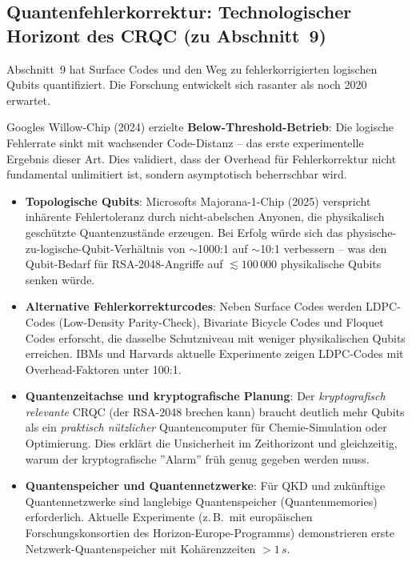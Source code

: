 ﻿\documentclass[a4paper,12pt]{article}
\theoremstyle{definition}
\begin{document}
\subsection{Quantenfehlerkorrektur: Technologischer Horizont des CRQC (zu Abschnitt~9)}

Abschnitt~9 hat Surface Codes und den Weg zu fehlerkorrigierten
logischen Qubits quantifiziert. Die Forschung entwickelt sich
rasanter als noch 2020 erwartet.

Googles Willow-Chip (2024) erzielte \textbf{Below-Threshold-Betrieb}:
Die logische Fehlerrate sinkt mit wachsender Code-Distanz -- das erste
experimentelle Ergebnis dieser Art. Dies validiert, dass der
Overhead für Fehlerkorrektur nicht fundamental unlimitiert ist,
sondern asymptotisch beherrschbar wird.

\begin{itemize}
  \item \textbf{Topologische Qubits}:
    Microsofts Majorana-1-Chip (2025) verspricht inhärente
    Fehlertoleranz durch nicht-abelschen Anyonen, die physikalisch
    geschützte Quantenzustände erzeugen. Bei Erfolg würde sich das
    physische-zu-logische-Qubit-Verhältnis von $\sim$1000:1 auf
    $\sim$10:1 verbessern -- was den Qubit-Bedarf für RSA-2048-Angriffe
    auf $\lesssim 100\,000$ physikalische Qubits senken würde.
  \item \textbf{Alternative Fehlerkorrekturcodes}:
    Neben Surface Codes werden LDPC-Codes (Low-Density Parity-Check),
    Bivariate Bicycle Codes und Floquet Codes erforscht,
    die dasselbe Schutzniveau mit weniger physikalischen Qubits erreichen.
    IBMs und Harvards aktuelle Experimente zeigen LDPC-Codes mit
    Overhead-Faktoren unter 100:1.
  \item \textbf{Quantenzeitachse und kryptografische Planung}:
    Der \emph{kryptografisch relevante} CRQC (der RSA-2048 brechen kann)
    braucht deutlich mehr Qubits als ein \emph{praktisch nützlicher}
    Quantencomputer für Chemie-Simulation oder Optimierung.
    Dies erklärt die Unsicherheit im Zeithorizont und gleichzeitig,
    warum der kryptografische ''Alarm'' früh genug gegeben werden muss.
  \item \textbf{Quantenspeicher und Quantennetzwerke}:
    Für QKD und zukünftige Quantennetzwerke sind langlebige
    Quantenspeicher (Quantenmemories) erforderlich. Aktuelle
    Experimente (z.\,B.\ mit europäischen Forschungskonsortien
    des Horizon-Europe-Programms) demonstrieren erste
    Netzwerk-Quantenspeicher mit Kohärenzzeiten $> 1\,s$.
\end{itemize}
\end{document}
